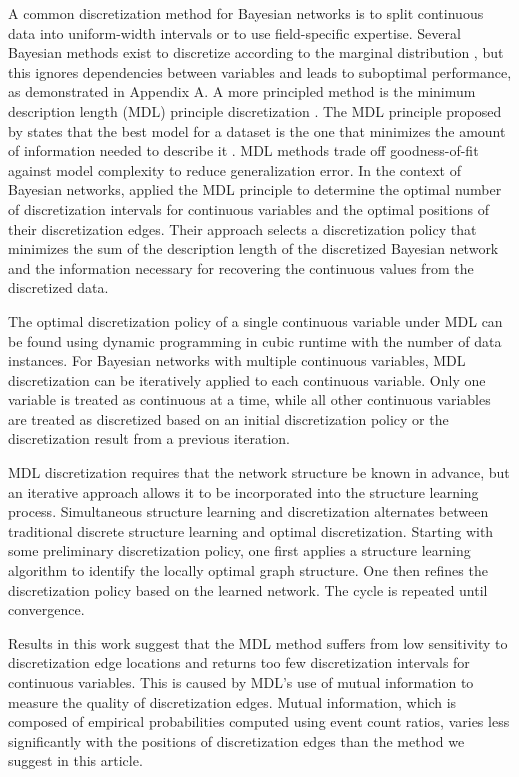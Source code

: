 \documentclass[twoside,11pt]{article}
\newcommand{\citep}[1]{\cite{#1}}
\newcommand{\citet}[1]{\citeauthor{#1} \citeyear{#1}}
\begin{document}
A common discretization method for Bayesian networks is to split continuous data into uniform-width intervals or to use field-specific expertise.
Several Bayesian methods exist to discretize according to the marginal distribution \citep{scott1979optimal,freedman1981histogram,knuth2013optimal,scargle2013studies}, but this ignores dependencies between variables and leads to suboptimal performance, as demonstrated in Appendix A.
A more principled method is the minimum description length (MDL) principle discretization \citep{Friedman_1996}.
The MDL principle proposed by \citet{MDL_1978} states that the best model for a dataset is the one that minimizes the amount of information needed to describe it \citep{Grunwald_2009}.
MDL methods trade off goodness-of-fit against model complexity to reduce generalization error.
In the context of Bayesian networks, \citet{Friedman_1996} applied the MDL principle to determine the optimal number of discretization intervals for continuous variables and the optimal positions of their discretization edges.
Their approach selects a discretization policy that minimizes the sum of the description length of the discretized Bayesian network and the information necessary for recovering the continuous values from the discretized data.

The optimal discretization policy of a single continuous variable under MDL can be found using dynamic programming in cubic runtime with the number of data instances.
For Bayesian networks with multiple continuous variables, MDL discretization can be iteratively applied to each continuous variable.
Only one variable is treated as continuous at a time, while all other continuous variables are treated as discretized based on an initial discretization policy or the discretization result from a previous iteration.

MDL discretization requires that the network structure be known in advance, but an iterative approach allows it to be incorporated into the structure learning process.
Simultaneous structure learning and discretization alternates between traditional discrete structure learning and optimal discretization.
Starting with some preliminary discretization policy, one first applies a structure learning algorithm to identify the locally optimal graph structure.
One then refines the discretization policy based on the learned network.
The cycle is repeated until convergence.

Results in this work suggest that the MDL method suffers from low sensitivity to discretization edge locations and returns too few discretization intervals for continuous variables.
This is caused by MDL's use of mutual information to measure the quality of discretization edges.
Mutual information, which is composed of empirical probabilities computed using event count ratios, varies less significantly with the positions of discretization edges than the method we suggest in this article.
\end{document}

